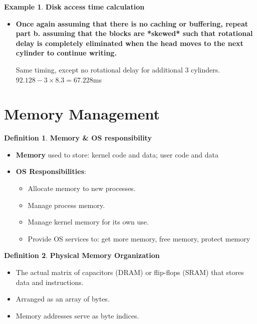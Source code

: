 \documentclass[11pt,a4paper]{article}
\theoremstyle{definition}
\newtheorem{definition}{Definition}[section]
\newtheorem{example}{Example}[section]
\newenvironment{myitemize}
{ \begin{itemize}
    \setlength{\itemsep}{5pt}
    \setlength{\parskip}{0pt}
    \setlength{\parsep}{0pt}     }
{ \end{itemize}                  }
\begin{document}
\begin{example}{\textbf{Disk access time calculation}}
\begin{myitemize}
\begin{myitemize}
			Rotation delay still 8.3ms; Total time to read data still: 0.08192ms
			
			Total: $3\times (2+8.3+0.08192)\times 3 = 31.146$ms
		\end{myitemize}
		
		\textbf{Total time taken}: 40.6+20.382+31.146=92.128ms
		
		\item \textbf{Once again assuming that there is no caching or buffering, repeat part b. assuming that the blocks are *skewed* such that rotational delay is completely eliminated when the head moves to the next cylinder to continue writing.}
		
		Same timing, except no rotational delay for additional 3 cylinders. $92.128 - 3\times8.3 = 67.228 $ms
	\end{myitemize}
\end{example}


\newpage
\section{Memory Management}

\begin{definition}{\textbf{Memory \& OS responsibility}}
	\begin{myitemize}
		\item \textbf{Memory} used to store: kernel code and data; user code and data
		\item \textbf{OS Responsibilities}: 
		\begin{myitemize}
			\item Allocate memory to new processes.
			\item Manage process memory.
			\item Manage kernel memory for its own use.
			\item Provide OS services to: get more memory, free memory, protect memory
		\end{myitemize}
	\end{myitemize}
\end{definition}

\begin{definition}{\textbf{Physical Memory Organization}}
	\begin{myitemize}
		\item The actual matrix of capacitors (DRAM) or flip-flops (SRAM) that stores data and instructions.
		\item Arranged as an array of bytes.
		\item Memory addresses serve as byte indices.
	\end{myitemize}
\end{definition}
\end{document}
